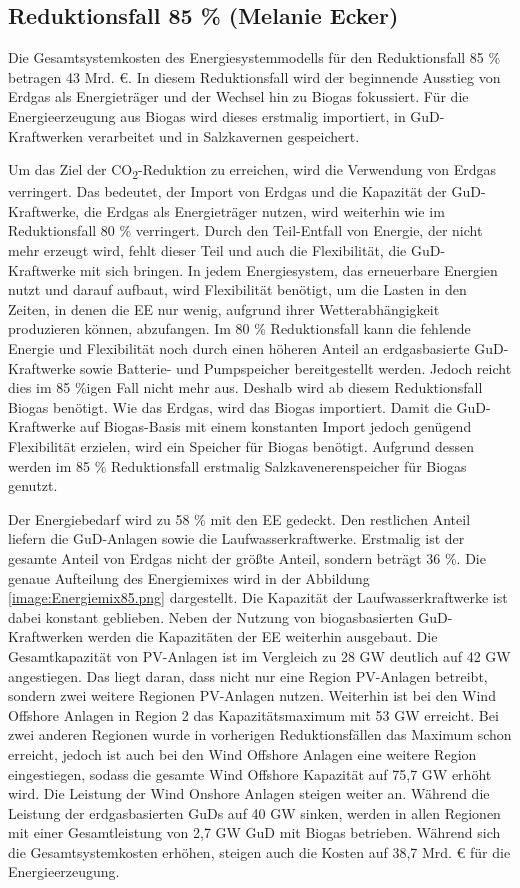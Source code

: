 \newpage
\subsection{Reduktionsfall 85 \% (Melanie Ecker)}
Die Gesamtsystemkosten des Energiesystemmodells für den Reduktionsfall 85 \% betragen 43 Mrd. €. In diesem Reduktionsfall wird der beginnende Ausstieg von Erdgas als Energieträger und der Wechsel hin zu Biogas fokussiert. Für die Energieerzeugung aus Biogas wird dieses erstmalig importiert, in GuD-Kraftwerken verarbeitet und in Salzkavernen gespeichert.

Um das Ziel der CO\textsubscript{2}-Reduktion zu erreichen, wird die Verwendung von Erdgas verringert. Das bedeutet, der Import von Erdgas und die Kapazität der GuD-Kraftwerke, die Erdgas als Energieträger nutzen, wird weiterhin wie im Reduktionsfall 80 \% verringert. 
Durch den Teil-Entfall von Energie, der nicht mehr erzeugt wird, fehlt dieser Teil und auch die Flexibilität, die GuD-Kraftwerke mit sich bringen. 
In jedem Energiesystem, das erneuerbare Energien nutzt und darauf aufbaut, wird Flexibilität benötigt, um die Lasten in den Zeiten, in denen die EE nur wenig, aufgrund ihrer Wetterabhängigkeit produzieren können, abzufangen.
Im 80 \% Reduktionsfall kann die fehlende Energie und Flexibilität noch durch einen höheren Anteil an erdgasbasierte GuD-Kraftwerke sowie Batterie- und Pumpspeicher bereitgestellt werden. Jedoch reicht dies im 85 \%igen Fall nicht mehr aus. Deshalb wird ab diesem Reduktionsfall Biogas benötigt.
Wie das Erdgas, wird das Biogas importiert. Damit die GuD-Kraftwerke auf Biogas-Basis mit einem konstanten Import jedoch genügend Flexibilität erzielen, wird ein Speicher für Biogas benötigt. Aufgrund dessen werden im 85 \% Reduktionsfall erstmalig Salzkavenerenspeicher für Biogas genutzt.

Der Energiebedarf wird zu 58 \% mit den EE gedeckt. Den restlichen Anteil liefern die GuD-Anlagen sowie die Laufwasserkraftwerke.
Erstmalig ist der gesamte Anteil von Erdgas nicht der größte Anteil, sondern beträgt 36 \%. Die genaue Aufteilung des Energiemixes wird in der Abbildung \ref{image:Energiemix85.png} dargestellt. Die Kapazität der Laufwasserkraftwerke ist dabei konstant geblieben.
Neben der Nutzung von biogasbasierten GuD-Kraftwerken werden die Kapazitäten der EE weiterhin ausgebaut. Die Gesamtkapazität von PV-Anlagen ist im Vergleich zu 28 GW deutlich auf 42 GW angestiegen. Das liegt daran, dass nicht nur eine Region PV-Anlagen betreibt, sondern zwei weitere Regionen PV-Anlagen nutzen.
Weiterhin ist bei den Wind Offshore Anlagen in Region 2 das Kapazitätsmaximum mit 53 GW erreicht. Bei zwei anderen Regionen wurde in vorherigen Reduktionsfällen das Maximum schon erreicht, jedoch ist auch bei den Wind Offshore Anlagen eine weitere Region eingestiegen, sodass die gesamte Wind Offshore Kapazität auf 75,7 GW erhöht wird.
Die Leistung der Wind Onshore Anlagen steigen weiter an.
Während die Leistung der erdgasbasierten GuDs auf 40 GW sinken, werden in allen Regionen mit einer Gesamtleistung von 2,7 GW GuD mit Biogas betrieben. 
Während sich die Gesamtsystemkosten erhöhen, steigen auch die Kosten auf 38,7 Mrd. € für die Energieerzeugung.

